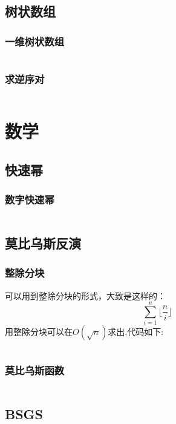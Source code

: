 \documentclass[a4paper,11pt]{article}
\begin{document}
\subsection{树状数组}
\subsubsection{一维树状数组}
\inputminted[breaklines,linenos,frame=leftline]{c++}{DataStruct/BIT1.cpp}
\subsubsection{求逆序对}
\inputminted[breaklines,linenos,frame=leftline]{c++}{DataStruct/BIT2.cpp}


\newpage
\section{数学}

\subsection{快速幂}
\subsubsection{数字快速幂}
\inputminted[breaklines,linenos,frame=leftline]{c++}{math/quickpow1.cpp}

\subsection{莫比乌斯反演}
\subsubsection{整除分块}
可以用到整除分块的形式，大致是这样的：
$$\sum_{i=1}^n \lfloor \frac{n}{i} \rfloor $$
用整除分块可以在$O  (\sqrt{n})$求出,代码如下:
\inputminted[breaklines,linenos,frame=leftline]{c++}{math/RemoveTheBlock.cpp}
\subsubsection{莫比乌斯函数}
\inputminted[breaklines,linenos,frame=leftline]{c++}{math/MobiusFunction.cpp}

\subsection{BSGS}
\inputminted[breaklines,linenos,frame=leftline]{c++}{math/BSGS.cpp}
\end{document}
